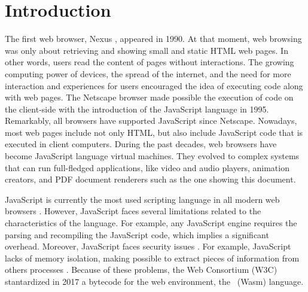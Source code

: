 \chapter{Introduction}
\label{chapter:intro}


The first web browser, Nexus \cite{nexus}, appeared in 1990.
At that moment, web browsing was only about retrieving and showing small and static HTML web pages.
In other words, users read the content of pages without interactions.
The growing computing power of devices, the spread of the internet, and the need for more interaction and experiences for users encouraged the idea of executing code along with web pages.
The Netscape browser made possible the execution of code on the client-side with the introduction of the JavaScript \cite{10.1007/978-3-642-14107-2_7} language in 1995.
Remarkably, all browsers have supported JavaScript since Netscape. 
Nowadays, most web pages include not only HTML, but also include JavaScript code that is executed in client computers.
During the past decades, web browsers have become JavaScript language virtual machines. 
They evolved to complex systems that can run full-fledged applications, like video and audio players, animation creators, and PDF document renderers such as the one showing this document.



JavaScript is currently the most used scripting language in all modern web browsers \cite{mulazzani2013fast}. 
However, JavaScript faces several limitations related to the characteristics of the language. For example, any JavaScript engine requires the parsing and recompiling the JavaScript code, which implies a significant overhead.
Moreover, JavaScript faces security issues \cite{10.1145/1190216.1190252}.
For example, JavaScript lacks of memory isolation, making possible to extract pieces of information from others processes \cite{10.1145/3412841.3442001}.
Because of these problems, the Web Consortium (W3C) stantardized in 2017 a bytecode for the web environment, the \wasm\ (Wasm) language. 

